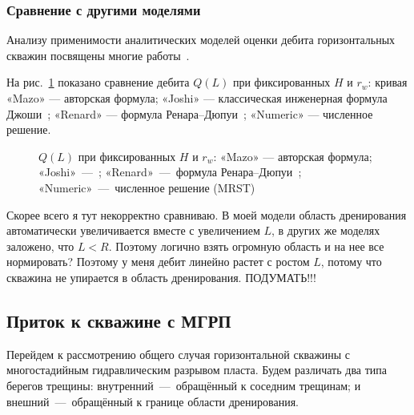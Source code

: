 \documentclass{article}
\begin{document}
\subsubsection{Сравнение с другими моделями}
Анализу применимости аналитических моделей оценки дебита горизонтальных скважин посвящены многие
работы~\cite{lit:kham_shubin2018,lit:kham_nasybullin2023}.

На рис.~\ref{fig:kham_compare_hw_mrst} показано сравнение дебита $Q(L)$ при фиксированных $H$ и $r_w$:
кривая «Mazo» — авторская формула; «Joshi» — классическая инженерная формула Джоши~\cite{lit:kham_joshi1988};
«Renard» — формула Ренара–Дюпуи~\cite{lit:kham_renard_dupuy1991}; «Numeric» — численное решение.
\begin{figure}[H]
	\centering
	
	\caption{$Q(L)$ при фиксированных $H$ и $r_w$: «Mazo» — авторская формула; «Joshi»~---~\cite{lit:kham_joshi1988};
		«Renard»~---~формула Ренара–Дюпуи~\cite{lit:kham_renard_dupuy1991}; «Numeric»~---~численное решение (MRST)}
	\label{fig:kham_compare_hw_mrst}
\end{figure}

{\color{red} Скорее всего я тут некорректно сравниваю. В моей модели область дренирования автоматически увеличивается вместе с увеличением
$L$, в других же моделях заложено, что $L < R$. Поэтому логично взять огромную область и на нее все нормировать?
Поэтому у меня дебит линейно растет с ростом $L$, потому что скважина не упирается в область дренирования. ПОДУМАТЬ!!!}

\subsection{Приток к скважине с МГРП}
Перейдем к рассмотрению общего случая горизонтальной скважины с многостадийным гидравлическим разрывом пласта.
Будем различать два типа берегов трещины: внутренний~---~обращённый к соседним трещинам;
и внешний~---~обращённый к границе области дренирования.
\end{document}
